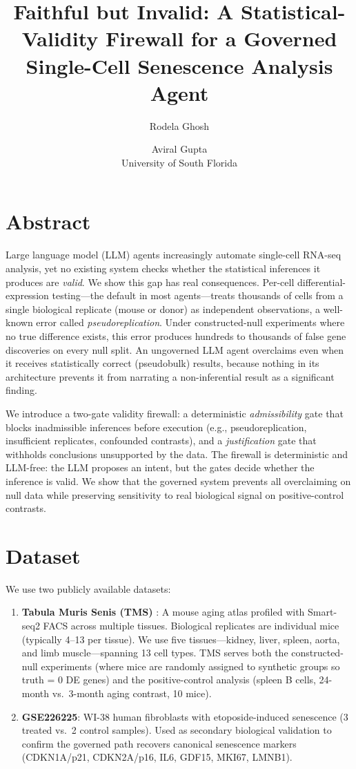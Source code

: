 \documentclass[11pt]{article}
\title{Faithful but Invalid: A Statistical-Validity Firewall for a Governed
Single-Cell Senescence Analysis Agent}
\author{Rodela Ghosh \and Aviral Gupta\\
University of South Florida}
\date{}
\begin{document}
\maketitle

\section{Abstract}

Large language model (LLM) agents increasingly automate single-cell RNA-seq
analysis, yet no existing system checks whether the statistical inferences it
produces are \textit{valid}. We show this gap has real consequences. Per-cell
differential-expression testing---the default in most agents---treats thousands
of cells from a single biological replicate (mouse or donor) as independent
observations, a well-known error called \textit{pseudoreplication}. Under
constructed-null experiments where no true difference exists, this error
produces hundreds to thousands of false gene discoveries on every null split.
An ungoverned LLM agent overclaims even when it receives statistically correct
(pseudobulk) results, because nothing in its architecture prevents it from
narrating a non-inferential result as a significant finding.

We introduce a two-gate validity firewall: a deterministic
\textit{admissibility} gate that blocks inadmissible inferences before
execution (e.g., pseudoreplication, insufficient replicates, confounded
contrasts), and a \textit{justification} gate that withholds conclusions
unsupported by the data. The firewall is deterministic and LLM-free: the LLM
proposes an intent, but the gates decide whether the inference is valid. We
show that the governed system prevents all overclaiming on null data while
preserving sensitivity to real biological signal on positive-control contrasts.

\section{Dataset}

We use two publicly available datasets:

\begin{enumerate}
  \item \textbf{Tabula Muris Senis (TMS)} \citep{tabulamuris2020}: A mouse
  aging atlas profiled with Smart-seq2 FACS across multiple tissues. Biological
  replicates are individual mice (typically 4--13 per tissue). We use five
  tissues---kidney, liver, spleen, aorta, and limb muscle---spanning 13
  cell types. TMS serves both the constructed-null experiments (where mice are
  randomly assigned to synthetic groups so truth = 0 DE genes) and the
  positive-control analysis (spleen B cells, 24-month vs.\ 3-month aging
  contrast, 10 mice).

  \item \textbf{GSE226225}: WI-38 human fibroblasts with etoposide-induced
  senescence (3 treated vs.\ 2 control samples). Used as secondary biological
  validation to confirm the governed path recovers canonical senescence markers
  (CDKN1A/p21, CDKN2A/p16, IL6, GDF15, MKI67, LMNB1).
\end{enumerate}
\end{document}
